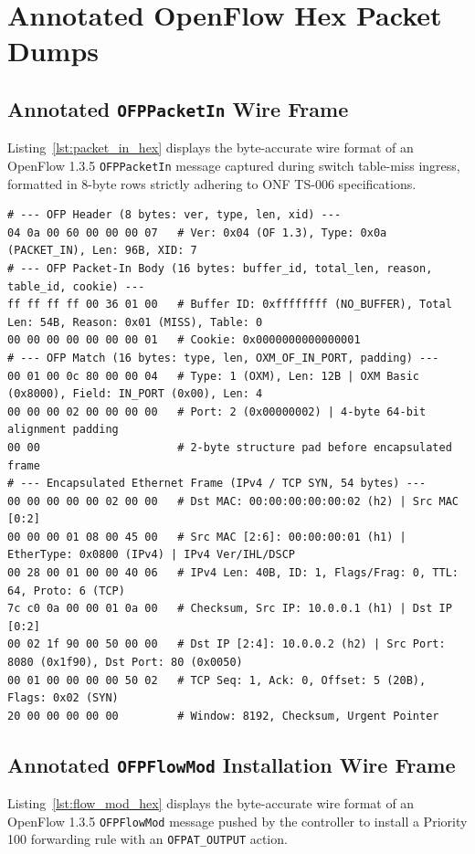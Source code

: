 \section{Annotated OpenFlow Hex Packet Dumps}

\subsection{Annotated \texttt{OFPPacketIn} Wire Frame}
Listing~\ref{lst:packet_in_hex} displays the byte-accurate wire format of an OpenFlow 1.3.5 \texttt{OFPPacketIn} message captured during switch table-miss ingress, formatted in 8-byte rows strictly adhering to ONF TS-006 specifications.

\begin{lstlisting}[basicstyle=\ttfamily\scriptsize, caption={Byte-Accurate Hex Dump of OFPPacketIn Message (OpenFlow 1.3.5)}, label={lst:packet_in_hex}]
# --- OFP Header (8 bytes: ver, type, len, xid) ---
04 0a 00 60 00 00 00 07   # Ver: 0x04 (OF 1.3), Type: 0x0a (PACKET_IN), Len: 96B, XID: 7
# --- OFP Packet-In Body (16 bytes: buffer_id, total_len, reason, table_id, cookie) ---
ff ff ff ff 00 36 01 00   # Buffer ID: 0xffffffff (NO_BUFFER), Total Len: 54B, Reason: 0x01 (MISS), Table: 0
00 00 00 00 00 00 00 01   # Cookie: 0x0000000000000001
# --- OFP Match (16 bytes: type, len, OXM_OF_IN_PORT, padding) ---
00 01 00 0c 80 00 00 04   # Type: 1 (OXM), Len: 12B | OXM Basic (0x8000), Field: IN_PORT (0x00), Len: 4
00 00 00 02 00 00 00 00   # Port: 2 (0x00000002) | 4-byte 64-bit alignment padding
00 00                     # 2-byte structure pad before encapsulated frame
# --- Encapsulated Ethernet Frame (IPv4 / TCP SYN, 54 bytes) ---
00 00 00 00 00 02 00 00   # Dst MAC: 00:00:00:00:00:02 (h2) | Src MAC [0:2]
00 00 00 01 08 00 45 00   # Src MAC [2:6]: 00:00:00:01 (h1) | EtherType: 0x0800 (IPv4) | IPv4 Ver/IHL/DSCP
00 28 00 01 00 00 40 06   # IPv4 Len: 40B, ID: 1, Flags/Frag: 0, TTL: 64, Proto: 6 (TCP)
7c c0 0a 00 00 01 0a 00   # Checksum, Src IP: 10.0.0.1 (h1) | Dst IP [0:2]
00 02 1f 90 00 50 00 00   # Dst IP [2:4]: 10.0.0.2 (h2) | Src Port: 8080 (0x1f90), Dst Port: 80 (0x0050)
00 01 00 00 00 00 50 02   # TCP Seq: 1, Ack: 0, Offset: 5 (20B), Flags: 0x02 (SYN)
20 00 00 00 00 00         # Window: 8192, Checksum, Urgent Pointer
\end{lstlisting}

\subsection{Annotated \texttt{OFPFlowMod} Installation Wire Frame}
Listing~\ref{lst:flow_mod_hex} displays the byte-accurate wire format of an OpenFlow 1.3.5 \texttt{OFPFlowMod} message pushed by the controller to install a Priority 100 forwarding rule with an \texttt{OFPAT\_OUTPUT} action.


